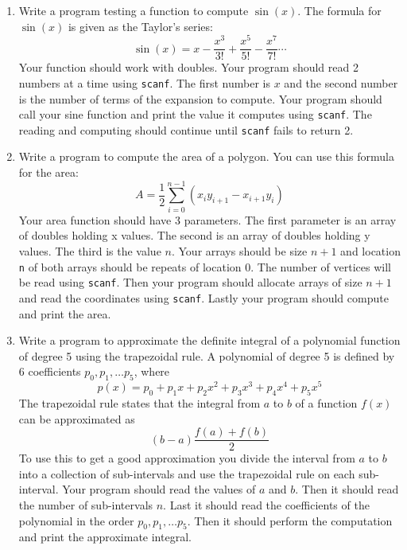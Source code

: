\documentclass[11pt,b5paper]{book}
\begin{document}
\begin{enumerate}
    \item Write a program testing a function to compute $\sin(x)$.
    The formula for $\sin(x)$ is given as the Taylor's series:
    $$\sin(x) = x - \frac{x^3}{3!} + \frac{x^5}{5!} - \frac{x^7}{7!} \cdots$$
    Your function should work with doubles.
    Your program should read 2 numbers at a time using {\tt scanf}.
    The first number is $x$ and the second number is the number of terms of the
    expansion to compute.
    Your program should call your sine function and print the value it computes using {\tt scanf}.
    The reading and computing should continue until {\tt scanf} fails to return 2.
    
    \item Write a program to compute the area of a polygon.
    You can use this formula for the area:
    $$A = \frac{1}{2} \sum_{i=0}^{n-1}{(x_iy_{i+1}-x_{i+1}y_i)}$$
    Your area function should have 3 parameters.
    The first parameter is an array of doubles holding x values.
    The second is an array of doubles holding y values.
    The third is the value $n$.
    Your arrays should be size $n+1$ and location {\tt n} of both arrays should be repeats of
    location 0.
    The number of vertices will be read using {\tt scanf}.
    Then your program should allocate arrays of size $n+1$ and
    read the coordinates using {\tt scanf}.
    Lastly your program should compute and print the area.
    
    \item Write a program to approximate the definite integral of a polynomial function
    of degree 5 using the trapezoidal rule.
    A polynomial of degree 5 is defined by 6 coefficients $p_0, p_1, \ldots p_5$, where
    $$p(x) = p_0 + p_1x + p_2x^2 + p_3x^3 + p_4x^4 + p_5x^5$$
    The trapezoidal rule states that the integral from $a$ to $b$ of a function $f(x)$ can
    be approximated as 
    $$(b - a)\frac{f(a)+f(b)}{2}$$
    To use this to get a good approximation you divide the interval from $a$ to $b$ into a
    collection of sub-intervals and use the trapezoidal rule on each sub-interval.
    Your program should read the values of $a$ and $b$.
    Then it should read the number of sub-intervals $n$.
    Last it should read the coefficients of the polynomial in the order $p_0, p_1, \ldots p_5$. 
    Then it should perform the computation and print the approximate integral.
    
\end{enumerate}
\end{document}
